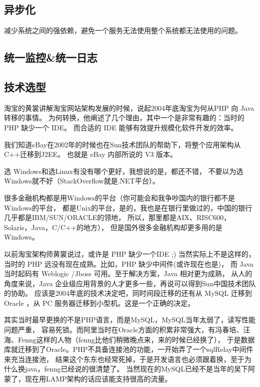 \documentclass{book}
\begin{document}
\subsection{异步化}

减少系统之间的强依赖，避免一个服务无法使用整个系统都无法使用的问题。

\subsection{统一监控\&统一日志}

\subsection{技术选型}

淘宝的黄裳讲解淘宝网站架构发展的时候，说起2004年底淘宝为何从PHP 向 Java 转移的事情。
为何转换，他阐述了几个理由，其中一个是非常有趣的：当时的 PHP 缺少一个 IDE。
而合适的 IDE 能够有效提升规模化软件开发的效率。

我们知道eBay在2002年的时候也在Sun技术团队的帮助下，将整个应用架构从C++迁移到J2EE。
也就是 eBay 内部所说的 V3 版本。

选 Windows和选Linux有没有哪个更好，我想说的是，都还不错，
不要以为选Windows就不好（StackOverflow就是.NET平台）。

很多金融机构都是用Windows的平台（你可能会和我争吵国内的银行都不是Windows的平台，
都是Unix的平台，是的，我也是在银行里做过的，中国的银行几乎都是IBM/SUN/ORACLE的领地，
所以，那里都是AIX、RISC600，Solaris，Java，C/C++的地方），
但是国外很多金融机构却更多用的是Windows。

以前淘宝架构师黄裳说过，或许是 PHP 缺少一个IDE ;) 当然实际上不是这样的，
当时的 PHP 远没有现在成熟。比如，PHP 缺少中间件(或许现在也是)，
而 Java 当时起码有 Weblogic /Jboss 可用。至于解决方案，Java 相对更为成熟，
从人的角度来说，Java 企业级应用背景的人才更多一些，再说可以得到Sun中国技术团队的协助。
应该是2004年底的技术决定吧，同时间段迁移的还有从 MySQL 迁移到 Oracle ，从 PC 服务器迁移到小型机。这是一个正确的决定。

其实当时最早更换的不是PHP语言，而是MySQL，MySQL当年太弱了，读写性能问题严重，
容易死锁。而阿里当时在Oracle方面的积累非常强大，有冯春培、汪海、Fenng这样的人物（fenng比他们稍微晚点来，来的时候已经换了），
于是数据库就迁移到了Oracle。PHP不具备连接池的功能，一开始弄了一个sqlRelay中间件来充当连接池，
结果这个东东也经常死掉，于是开发语言也必须跟着换，至于为什么换java，fenng已经说的很清楚了。 
当然现在的MySQL已经不是当年的吴下阿蒙了，现在用LAMP架构的话应该能支持很高的流量。
\end{document}

